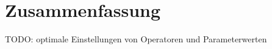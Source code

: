 \section{Zusammenfassung}\label{conclusion}

TODO: optimale Einstellungen von Operatoren und Parameterwerten

